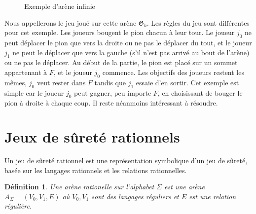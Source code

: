 \documentclass[12pt,a4paper,oneside,titlepage]{report}
\newtheorem{defi}{D\'efinition}[section]
\begin{document}
\begin{figure}[H]
\centering
{}
\caption{Exemple d'arène infinie}
\label{fig:infinite-arena}
\end{figure}
\noindent Nous appellerons le jeu joué sur cette arène $\mathfrak{G}_k$. Les règles du jeu sont différentes pour cet exemple. Les joueurs bougent le pion chacun à leur tour. Le joueur $j_0$ ne peut déplacer le pion que vers la droite ou ne pas le déplacer du tout, et le joueur $j_1$ ne peut le déplacer que vers la gauche (s'il n'est pas arrivé au bout de l'arène) ou ne pas le déplacer. Au début de la partie, le pion est placé sur un sommet appartenant à $F$, et le joueur $j_0$ commence. Les objectifs des joueurs restent les mêmes, $j_0$ veut rester dans $F$ tandis que $j_1$ essaie d'en sortir. Cet exemple est simple car le joueur $j_0$ peut gagner, peu importe $F$, en choisissant de bouger le pion à droite à chaque coup. Il reste néanmoins intéressant à résoudre.

\section{Jeux de sûreté rationnels}
Un jeu de sûreté rationnel est une représentation symbolique d'un jeu de sûreté, basée sur les langages rationnels et les relations rationnelles.
\begin{defi}
Une \emph{arène rationelle} sur l'alphabet $\Sigma$ est une arène $A_\Sigma=(V_0,V_1,E)$ où $V_0,V_1$ sont des langages réguliers et $E$ est une relation régulière.
\end{defi}
\end{document}
